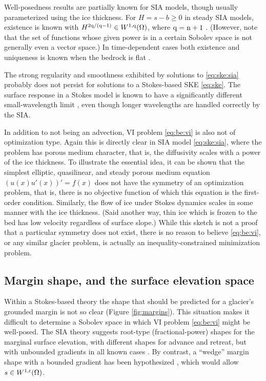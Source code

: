 \documentclass[hidelinks,onefignum,onetabnum,final]{siamart220329}  %
\newcommand{\nn}{{\text{\textnormal{n}}}}
\newcommand{\qq}{{\text{\textnormal{q}}}}
\newcommand{\rr}{{\text{\textnormal{r}}}}
\begin{document}
Well-posedness results are partially known for SIA models, though usually parameterized using the ice thickness.  For $H=s-b \ge 0$ in steady SIA models, existence is known with $H^{2\qq/(\qq-1)} \in W^{1,\qq}(\Omega)$, where $\qq=\nn+1$ \cite{JouvetBueler2012}.  (However, note that the set of functions whose given power is in a certain Sobolev space is not generally even a vector space.)  In time-dependent cases both existence and uniqueness is known when the bedrock is flat \cite{Calvoetal2003,PiersantiTemam2023}.

The strong regularity and smoothness exhibited by solutions to \eqref{eq:ske:sia} probably does not persist for solutions to a Stokes-based SKE \eqref{eq:ske}.  The surface response in a Stokes model is known to have a significantly different small-wavelength limit \cite{Pattynetal2008}, even though longer wavelengths are handled correctly by the SIA.

In addition to not being an advection, VI problem \eqref{eq:be:vi} is also not of optimization type.  Again this is directly clear in SIA model \eqref{eq:ske:sia}, where the problem has porous medium character, that is, the diffusivity scales with a power of the ice thickness.  To illustrate the essential idea, it can be shown that the simplest elliptic, quasilinear, and steady porous medium equation $(u(x) u'(x))' = f(x)$ does not have the symmetry of an optimization problem, that is, there is no objective function of which this equation is the first-order condition.  Similarly, the flow of ice under Stokes dynamics scales in some manner with the ice thickness.  (Said another way, thin ice which is frozen to the bed has low velocity regardless of surface slope.)  While this sketch is not a proof that a particular symmetry does not exist, there is no reason to believe \eqref{eq:be:vi}, or any similar glacier problem, is actually an inequality-constrained minimization problem.

\subsection{Margin shape, and the surface elevation space} \label{subsec:margin}  Within a Stokes-based theory the shape that should be predicted for a glacier's grounded margin is not so clear (Figure \ref{fig:margins}).  This situation makes it difficult to determine a Sobolev space in which VI problem \eqref{eq:be:vi} might be well-posed.  The SIA theory suggests root-type (fractional-power) shapes for the marginal surface elevation, with different shapes for advance and retreat, but with unbounded gradients in all known cases \cite{Bueleretal2005,JouvetBueler2012}.  By contrast, a ``wedge'' margin shape with a bounded gradient has been hypothesized \cite[for example]{EchelmeyerKamb1986}, which would allow $s\in W^{1,\rr}(\Omega)$.
\end{document}
